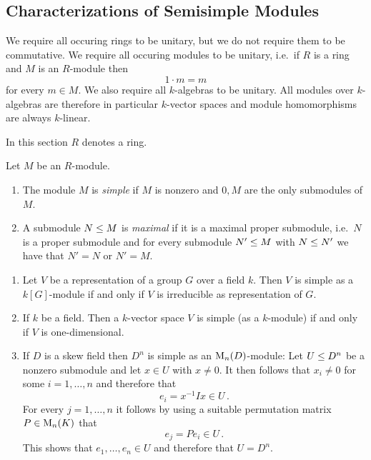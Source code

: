 \subsection{Characterizations of Semisimple Modules}


\begin{conventions}
  We require all occuring rings to be unitary, but we do not require them to be commutative.
  We require all occuring modules to be unitary, i.e.\ if $R$ is a ring and $M$ is an $R$-module then
  \[
      1 \cdot m
    = m
  \]
  for every $m \in M$.
  We also require all $k$-algebras to be unitary.
  All modules over $k$-algebras are therefore in particular $k$-vector spaces and module homomorphisms are always $k$-linear.
\end{conventions}


\begin{conventions}
  In this section $R$ denotes a ring.
\end{conventions}


\begin{definition}
  \label{definition: simple and maximal modules}
  Let $M$ be an $R$-module.
  \begin{enumerate}
    \item
      The module $M$ is \emph{simple} if $M$ is nonzero and $0, M$ are the only submodules of $M$.
    \item
      A submodule $N \leq M$ is \emph{maximal} if it is a maximal proper submodule, i.e.\ $N$ is a proper submodule and for every submodule $N' \leq M$ with $N \leq N'$ we have that $N' = N$ or $N' = M$.
  \end{enumerate}
\end{definition}


\begin{example}
  \leavevmode
  \begin{enumerate}
    \item
      Let $V$ be a representation of a group $G$ over a field $k$.
      Then $V$ is simple as a $k[G]$-module if and only if $V$ is irreducible as representation of $G$.
    \item
      If $k$ be a field.
      Then a $k$-vector space $V$ is simple (as a $k$-module) if and only if $V$ is one-dimensional.
    \item
      If $D$ is a skew field then $D^n$ is simple as an $\operatorname{M}_n(D)$-module:
      Let $U \leq D^n$ be a nonzero submodule and let $x \in U$ with $x \neq 0$.
      It then follows that $x_i \neq 0$ for some $i = 1, \dotsc, n$ and therefore that
      \[
            e_i
        =   x^{-1} I x
        \in U \,.
      \]
      For every $j = 1, \dotsc, n$ it follows by using a suitable permutation matrix $P \in \operatorname{M}_n(K)$ that
      \[
            e_j
        =   P e_i
        \in U \,.
      \]
      This shows that $e_1, \dotsc, e_n \in U$ and therefore that $U = D^n$.
  \end{enumerate}
\end{example}


